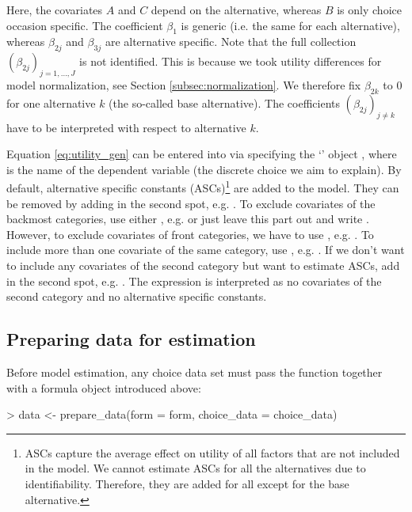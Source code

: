 \documentclass[article]{jss}
\newcommand{\class}[1]{`\code{#1}'}
\newcommand{\fct}[1]{\code{#1()}}
\begin{document}
Here, the covariates $A$ and $C$ depend on the alternative, whereas $B$ is only choice occasion specific. The coefficient $\beta_1$ is generic (i.e. the same for each alternative), whereas $\beta_{2j}$ and $\beta_{3j}$ are alternative specific. Note that the full collection $(\beta_{2j})_{j=1,\dots,J}$ is not identified. This is because we took utility differences for model normalization, see Section \ref{subsec:normalization}. We therefore fix $\beta_{2k}$ to 0 for one alternative $k$ (the so-called base alternative). The coefficients $(\beta_{2j})_{j\neq k}$ have to be interpreted with respect to alternative $k$.

Equation \eqref{eq:utility_gen} can be entered into  via specifying the \class{formula} object , where  is the name of the dependent variable (the discrete choice we aim to explain). By default, alternative specific constants (ASCs)\footnote{ASCs capture the average effect on utility of all factors that are not included in the model. We cannot estimate ASCs for all the alternatives due to identifiability. Therefore, they are added for all except for the base alternative.} are added to the model. They can be removed by adding  in the second spot, e.g. . To exclude covariates of the backmost categories, use either , e.g.  or just leave this part out and write . However, to exclude covariates of front categories, we have to use , e.g. . To include more than one covariate of the same category, use \code{+}, e.g. . If we don't want to include any covariates of the second category but want to estimate ASCs, add  in the second spot, e.g. . The expression  is interpreted as no covariates of the second category and no alternative specific constants.

\subsection{Preparing data for estimation} \label{subsec:prepare_data}

Before model estimation, any choice data set  must pass the \fct{prepare\_data} function together with a formula object  introduced above:

\begin{Schunk}
\begin{Sinput}
> data <- prepare_data(form = form, choice_data = choice_data)
\end{Sinput}
\end{Schunk}
\end{document}
